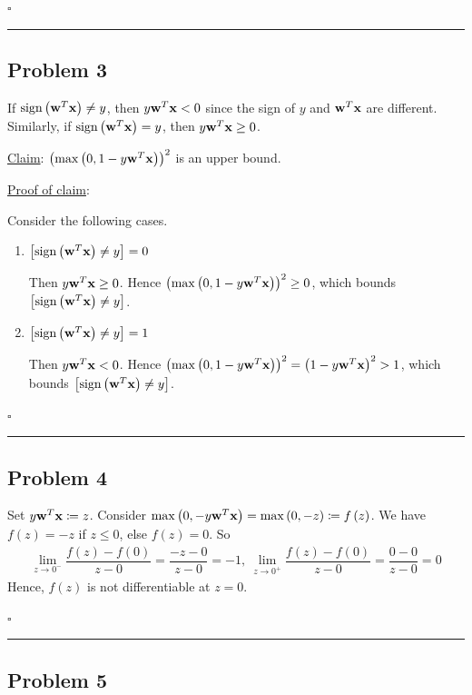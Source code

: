 \documentclass[12pt]{article}
\newcommand*{\QEDB}{\hfill\ensuremath{\square}}
\newcommand{\SBrackets}[1]{\left[#1\right]}
\newcommand{\ParTh}[1]{\left(#1\right)}
\newcommand{\BF}[1]{{\bf#1}}
\newcommand{\horrule}[1]{\rule{\linewidth}{#1}}
\begin{document}
\QEDB

\horrule{0.5pt}

\subsection*{Problem 3}

If $\text{sign}\ParTh{\BF{w}^T\BF{x}}\neq y$, then $y\BF{w}^T\BF{x}<0$ since the sign of $y$ and $\BF{w}^T\BF{x}$ are different. Similarly, if $\text{sign}\ParTh{\BF{w}^T\BF{x}}=y$, then $y\BF{w}^T\BF{x}\geq0$.

\underline{Claim}: $\ParTh{\max\ParTh{0,1-y\BF{w}^T\BF{x}}}^2$ is an upper bound.

\underline{Proof of claim}:

Consider the following cases.
\begin{enumerate}
	\item $\SBrackets{\text{sign}\ParTh{\BF{w}^T\BF{x}}\neq y}=0$
	
	Then $y\BF{w}^T\BF{x}\geq0$. Hence $\ParTh{\max\ParTh{0,1-y\BF{w}^T\BF{x}}}^2\geq0$, which bounds $\SBrackets{\text{sign}\ParTh{\BF{w}^T\BF{x}}\neq y}$.
	\item $\SBrackets{\text{sign}\ParTh{\BF{w}^T\BF{x}}\neq y}=1$
	
	Then $y\BF{w}^T\BF{x}<0$. Hence $\ParTh{\max\ParTh{0,1-y\BF{w}^T\BF{x}}}^2=\ParTh{1-y\BF{w}^T\BF{x}}^2>1$, which bounds $\SBrackets{\text{sign}\ParTh{\BF{w}^T\BF{x}}\neq y}$.
\end{enumerate}

\QEDB

\horrule{0.5pt}

\subsection*{Problem 4}

Set $y\BF{w}^T\BF{x}\coloneqq z$. Consider $\max\ParTh{0,-y\BF{w}^T\BF{x}}=\max\ParTh{0,-z}\coloneqq f\ParTh{z}$. We have $f\ParTh{z}=-z$ if $z\leq0$, else $f\ParTh{z}=0$. So 
\begin{align}
\lim\limits_{z\rightarrow0^{-}}\dfrac{f\ParTh{z}-f\ParTh{0}}{z-0}=\dfrac{-z-0}{z-0}=-1,~\lim\limits_{z\rightarrow0^{+}}\dfrac{f\ParTh{z}-f\ParTh{0}}{z-0}=\dfrac{0-0}{z-0}=0
\end{align}
Hence, $f\ParTh{z}$ is not differentiable at $z=0$.

\QEDB

\horrule{0.5pt}

\subsection*{Problem 5}
\end{document}
